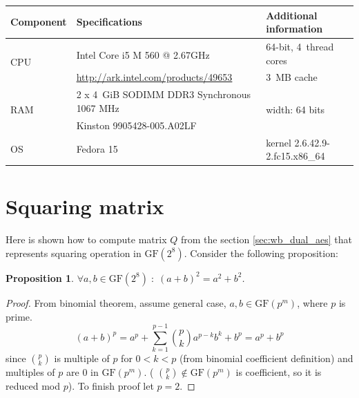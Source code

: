 \documentclass[11pt,oneside,final]{fithesis2}
\newtheorem{myprop}{Proposition}
\newcommand{\gfe}{\ensuremath{\text{GF}\left(2^8\right)}}
\begin{document}
    \begin{center}
    \begin{table}[ht]
    \begin{tabular}{ l | l | l }
	\hline
	Component & Specifications & Additional information \\
	\hline
	\hline
	\multirow{2}{*}{CPU} & Intel\textsuperscript{\textregistered} Core\textsuperscript{\texttrademark} i5 M 560 @ 2.67GHz & 64-bit, 4~thread cores  \\
	                     & \url{http://ark.intel.com/products/49653}                                                      & 3~MB cache              \\ \hline
	\multirow{2}{*}{RAM} & 2 x 4~GiB SODIMM DDR3 Synchronous 1067 MHz                                                     & \multirow{2}{*}{width: 64 bits}    \\
	                     & Kinston 9905428-005.A02LF                                                                      &    \\ \hline
	OS		     & Fedora 15										      & kernel 2.6.42.9-2.fc15.x86\_64 \\ \hline 
    \end{tabular}
    \end{table}
    \end{center}
    
    \section{Squaring matrix}\label{appendix:sqr_matrix}
    Here is shown how to compute matrix $Q$ from the section \ref{sec:wb_dual_aes} that represents squaring operation in $\gfe$. Consider the following proposition:
    
    \begin{myprop}\label{prop:squaring_is_linear}
     $\forall a,b \in \gfe \; : \; \left(a + b\right)^2 = a^2 + b^2$. 
    \end{myprop}
    \begin{proof}
    From binomial theorem, assume general case, $a,b \in \text{GF}(p^m)$, where $p$ is prime.
    \begin{equation*}
     (a+b)^p = a^p + \sum_{k=1}^{p-1} \binom{p}{k} a^{p-k}b^{k} + b^p = a^p + b^p
    \end{equation*}
    since $\binom{p}{k}$ is multiple of $p$ for $0 < k < p$ (from binomial coefficient definition) and multiples of $p$ are $0$ in $\text{GF}(p^m)$. (
    $\binom{p}{k} \notin \text{GF}(p^m)$ is coefficient, so it is reduced mod $p$). To finish proof let $p=2$.
    \end{proof}
\end{document}
